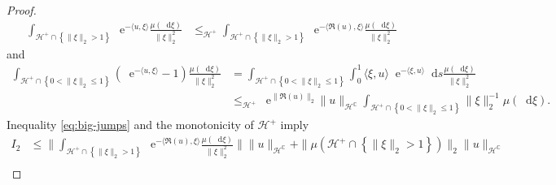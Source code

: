 \documentclass[10pt,a4paper,reqno]{amsart}
\newcommand*\D{\mathop{}\!\mathrm{d}}
\newcommand*\E{\mathop{}\!\mathrm{e}}
\numberwithin{equation}{section}
\theoremstyle{plain}
\theoremstyle{definition}
\theoremstyle{example}
\newcommand{\cH}{\mathcal{H}}
\newcommand{\set}[1]{\left\{ #1\right\}}
\newcommand{\norm}[1]{\|#1\|}
\newcommand{\cHplus}{\cH^{+}}
\begin{document}
\begin{proof}
\begin{align}
  \int_{\cHplus\cap\set{\norm{\xi}_2>1}}\E^{-\langle
    u,\xi\rangle} \frac{\mu(\D\xi)}{\norm{\xi}_2^{2}} &\leq_{\cHplus} \int_{\cHplus\cap\set{\norm{\xi}_2>1}}\E^{-\langle
    \Re(u),\xi\rangle} \frac{\mu(\D\xi)}{\norm{\xi}_2^{2}}
  \end{align}
  and 
  \begin{align}\label{eq:small-jumps}
    \int_{\cHplus\cap\set{0<\norm{\xi}_2\leq 1}} (\E^{-\langle
    u,\xi\rangle} -1)\frac{\mu(\D\xi)}{\norm{\xi}_2^{2}}%
                                                                               &=
                                                    \int_{\cHplus\cap\set{0<\norm{\xi}_2\leq
                                                    1}}\int_{0}^{1}\langle
                                                    \xi,u\rangle \E^{-\langle
                                                    \xi,u\rangle}\D s\frac{\mu(\D\xi)}{\norm{\xi}_2^{2}}\nonumber\\ 
    &\leq_{\cHplus} \E^{\norm{\Re(u)}_2}\norm{u}_{\cH^\mathbb{C}}\int_{\cHplus\cap\set{0<\norm{\xi}_2\leq 1}}\norm{\xi}_2^{-1}\mu(\D\xi).
  \end{align}
  Inequality \eqref{eq:big-jumps} and the monotonicity of $\cHplus$ imply 
  \begin{align*}
    I_2&\leq
                                                                                \norm{\int_{\cHplus\cap\set{\norm{\xi}_2>1}}\E^{-\langle
                                                                                \Re(u),\xi\rangle}\frac{\mu(\D\xi)}{\norm{\xi}_2^{2}}}\norm{u}_{\cH^{\mathbb{C}}}
    +\norm{\mu(\cHplus\cap\set{\norm{\xi}_2>1})}_2\norm{u}_{\cH^{\mathbb{C}}}\\

\end{align*}
\end{proof}
\end{document}
